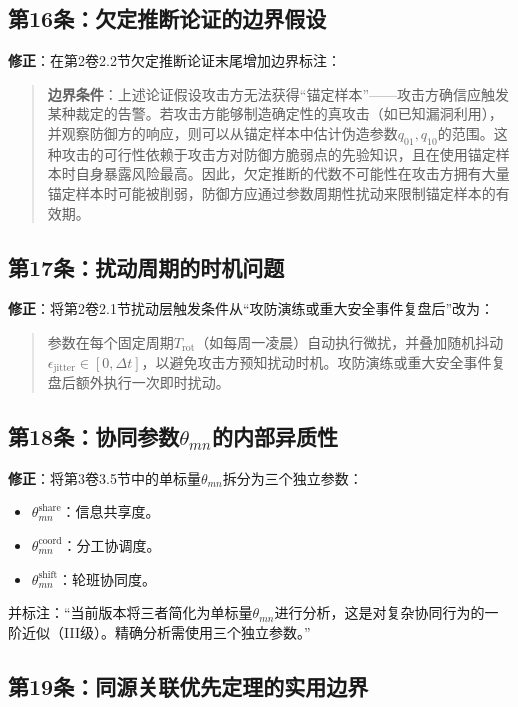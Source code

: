 \documentclass[11pt,a4paper]{article}
\begin{document}
\subsection{第16条：欠定推断论证的边界假设}

\textbf{修正}：在第2卷2.2节欠定推断论证末尾增加边界标注：
\begin{quote}
\textbf{边界条件}：上述论证假设攻击方无法获得“锚定样本”——攻击方确信应触发某种裁定的告警。若攻击方能够制造确定性的真攻击（如已知漏洞利用），并观察防御方的响应，则可以从锚定样本中估计伪造参数$q_{01}, q_{10}$的范围。这种攻击的可行性依赖于攻击方对防御方脆弱点的先验知识，且在使用锚定样本时自身暴露风险最高。因此，欠定推断的代数不可能性在攻击方拥有大量锚定样本时可能被削弱，防御方应通过参数周期性扰动来限制锚定样本的有效期。
\end{quote}

\subsection{第17条：扰动周期的时机问题}

\textbf{修正}：将第2卷2.1节扰动层触发条件从“攻防演练或重大安全事件复盘后”改为：
\begin{quote}
参数在每个固定周期$T_{\text{rot}}$（如每周一凌晨）自动执行微扰，并叠加随机抖动$\epsilon_{\text{jitter}} \in [0, \Delta t]$，以避免攻击方预知扰动时机。攻防演练或重大安全事件复盘后额外执行一次即时扰动。
\end{quote}

\subsection{第18条：协同参数$\theta_{mn}$的内部异质性}

\textbf{修正}：将第3卷3.5节中的单标量$\theta_{mn}$拆分为三个独立参数：
\begin{itemize}
    \item $\theta^{\text{share}}_{mn}$：信息共享度。
    \item $\theta^{\text{coord}}_{mn}$：分工协调度。
    \item $\theta^{\text{shift}}_{mn}$：轮班协同度。
\end{itemize}
并标注：“当前版本将三者简化为单标量$\theta_{mn}$进行分析，这是对复杂协同行为的一阶近似（III级）。精确分析需使用三个独立参数。”

\subsection{第19条：同源关联优先定理的实用边界}
\end{document}
